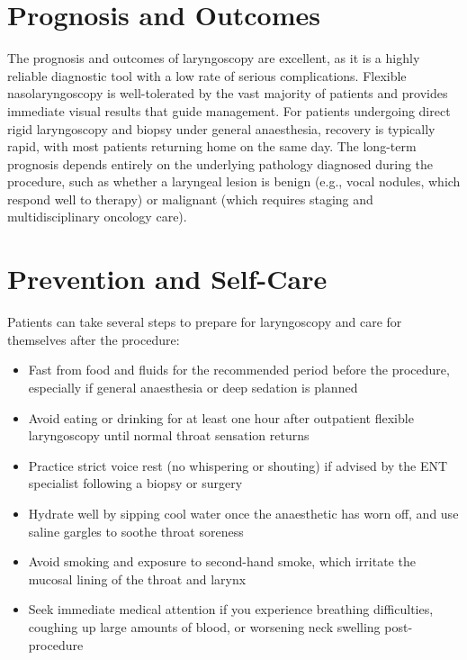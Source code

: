 \section*{Prognosis and Outcomes}
The prognosis and outcomes of laryngoscopy are excellent, as it is a highly reliable diagnostic tool with a low rate of serious complications. Flexible nasolaryngoscopy is well-tolerated by the vast majority of patients and provides immediate visual results that guide management. For patients undergoing direct rigid laryngoscopy and biopsy under general anaesthesia, recovery is typically rapid, with most patients returning home on the same day. The long-term prognosis depends entirely on the underlying pathology diagnosed during the procedure, such as whether a laryngeal lesion is benign (e.g., vocal nodules, which respond well to therapy) or malignant (which requires staging and multidisciplinary oncology care).

\section*{Prevention and Self-Care}
Patients can take several steps to prepare for laryngoscopy and care for themselves after the procedure:
\begin{itemize}
    \item Fast from food and fluids for the recommended period before the procedure, especially if general anaesthesia or deep sedation is planned
    \item Avoid eating or drinking for at least one hour after outpatient flexible laryngoscopy until normal throat sensation returns
    \item Practice strict voice rest (no whispering or shouting) if advised by the ENT specialist following a biopsy or surgery
    \item Hydrate well by sipping cool water once the anaesthetic has worn off, and use saline gargles to soothe throat soreness
    \item Avoid smoking and exposure to second-hand smoke, which irritate the mucosal lining of the throat and larynx
    \item Seek immediate medical attention if you experience breathing difficulties, coughing up large amounts of blood, or worsening neck swelling post-procedure
\end{itemize}

